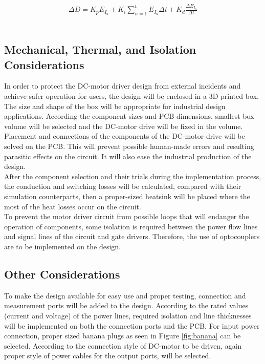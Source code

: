 \begin{equation}
    \begin{split}
        \Delta D = K_pE_{I_a} + K_i\sum_{n=1}^{t} E_{I_a}\Delta t + K_d\frac{\Delta E_{I_a}}{\Delta t}
    \end{split}
    \label{eqn:PID}
\end{equation}
\\
\subsection{Mechanical, Thermal, and Isolation Considerations}

In order to protect the DC-motor driver design from external incidents and achieve safer operation for users, the design will be enclosed in a 3D printed box. The size and shape of the box will be appropriate for industrial design applications. According the component sizes and PCB dimensions, smallest box volume will be selected and the DC-motor drive will be fixed in the volume. \\

Placement and connections of the components of the DC-motor drive will be solved on the PCB. This will prevent possible human-made errors and resulting parasitic effects on the circuit. It will also ease the industrial production of the design. \\

After the component selection and their trials during the implementation process, the conduction and switching losses will be calculated, compared with their simulation counterparts, then a proper-sized heatsink will be placed where the most of the heat losses occur on the circuit. \\

To prevent the motor driver circuit from possible loops that will endanger the operation of components, some isolation is required between the power flow lines and signal lines of the circuit and gate drivers. Therefore, the use of optocouplers are to be implemented on the design.

\subsection{Other Considerations}

To make the design available for easy use and proper testing, connection and measurement ports will be added to the design. According to the rated values (current and voltage) of the power lines, required isolation and line thicknesses will be implemented on both the connection ports and the PCB. For input power connection, proper sized banana plugs as seen in Figure \ref{fig:banana} can be selected. According to the connection style of DC-motor to be driven, again proper style of power cables for the output ports, will be selected.

